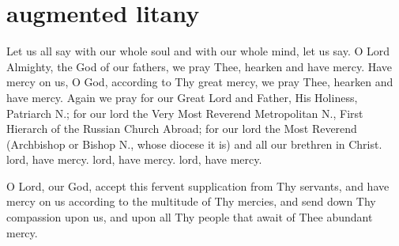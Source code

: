 \section{augmented litany}

\begin{liturgicaltext}
    \deacon Let us all say with our whole soul and with our whole mind, let us say.
    \choir {}
    \deacon O Lord Almighty, the God of our fathers, we pray Thee, hearken and have mercy.
    \choir {}
    \deacon Have mercy on us, O God, according to Thy great mercy, we pray Thee, hearken and have mercy.
    \choir {}
    \deacon Again we pray for our Great Lord and Father, His Holiness, Patriarch N.; for our lord the Very Most Reverend Metropolitan N., First Hierarch of the Russian Church Abroad; for our lord the Most Reverend (Archbishop or Bishop N., whose diocese it is) and all our brethren in Christ.
    \choirsemisecret lord, have mercy. lord, have mercy. lord, have mercy. 
\end{liturgicaltext}
\begin{semisecret}
    \begin{secretprayer}
        O Lord, our God, accept this fervent supplication from Thy servants, and have mercy on us according to the multitude of Thy mercies, and send down Thy compassion upon us, and upon all Thy people that await of Thee abundant mercy.
    \end{secretprayer}
\end{semisecret}
